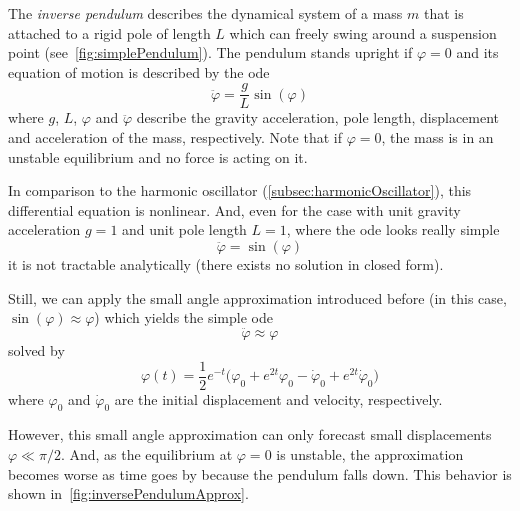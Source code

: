 		The \emph{inverse pendulum} describes the dynamical system of a mass \(m\) that is attached to a rigid pole of length \(L\) which can freely swing around a suspension point (see~\autoref{fig:simplePendulum}). The pendulum stands upright if \( \varphi = 0 \) and its equation of motion is described by the \ac{ode}
		\begin{equation*}
			\ddot{\varphi} = \frac{g}{L} \sin(\varphi)
		\end{equation*}
		where \(g\), \(L\), \(\varphi\) and \(\ddot{\varphi}\) describe the gravity acceleration, pole length, displacement and acceleration of the mass, respectively. Note that if \( \varphi = 0 \), the mass is in an unstable equilibrium and no force is acting on it.

		In comparison to the harmonic oscillator (\autoref{subsec:harmonicOscillator}), this differential equation is nonlinear. And, even for the case with unit gravity acceleration \( g = 1 \) and unit pole length \( L = 1\), where the \ac{ode} looks really simple
		\begin{equation}
			\ddot{\varphi} = \sin(\varphi)  \label{eq:inversePendulum}
		\end{equation}
		it is not tractable analytically (\ie there exists no solution in closed form).

		Still, we can apply the small angle approximation introduced before (in this case, \( \sin(\varphi) \approx \varphi \)) which yields the simple \ac{ode}
		\begin{equation}
			\ddot{\varphi} \approx \varphi  \label{eq:linearizedInversePendulum}
		\end{equation}
		solved by
		\begin{equation*}
			\varphi(t) = \frac{1}{2} e^{-t} \big(\varphi_0 + e^{2t} \varphi_0 - \dot{\varphi}_0 + e^{2t} \dot{\varphi}_0\big)
		\end{equation*}
		where \(\varphi_0\) and \(\dot{\varphi}_0\) are the initial displacement and velocity, respectively.

		However, this small angle approximation can only forecast small displacements \( \varphi \ll \pi/2 \). And, as the equilibrium at \( \varphi = 0 \) is unstable, the approximation becomes worse as time goes by because the pendulum falls down. This behavior is shown in~\autoref{fig:inversePendulumApprox}.

